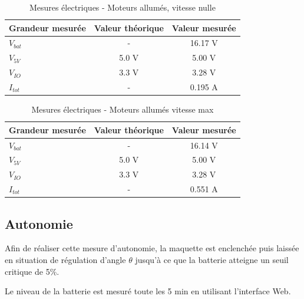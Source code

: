 \begin{table}[H]
    \centering
    \begin{tabular}{|l|c|c|}
        \hline
        \textbf{Grandeur mesurée} & \textbf{Valeur théorique} & \textbf{Valeur mesurée} \\
        \hline
        $V_{bat}$ & - & 16.17 V \\
        \hline
        $V_{5V}$ & 5.0 V & 5.00 V \\
        \hline
        $V_{IO}$ & 3.3 V & 3.28 V \\
        \hline
        $I_{tot}$ & - & 0.195 A \\
        \hline
    \end{tabular}
    \caption{Mesures électriques - Moteurs allumés, vitesse nulle}
    \label{tab:moteurs_allumes}
\end{table}


\begin{table}[H]
    \centering
    \begin{tabular}{|l|c|c|}
        \hline
        \textbf{Grandeur mesurée} & \textbf{Valeur théorique} & \textbf{Valeur mesurée} \\
        \hline
        $V_{bat}$ & - & 16.14 V \\
        \hline
        $V_{5V}$ & 5.0 V & 5.00 V \\
        \hline
        $V_{IO}$ & 3.3 V & 3.28 V \\
        \hline
        $I_{tot}$ & - & 0.551 A \\
        \hline
    \end{tabular}
    \caption{Mesures électriques - Moteurs allumés vitesse max}
    \label{tab:moteurs_allumes_maxspeed}
\end{table}

\subsection{Autonomie}
Afin de réaliser cette mesure d'autonomie, la maquette est enclenchée puis laissée en situation de régulation d'angle $\theta$ jusqu'à ce que la batterie atteigne un seuil critique de 5\%.

Le niveau de la batterie est mesuré toute les 5 min en utilisant l'interface Web.
